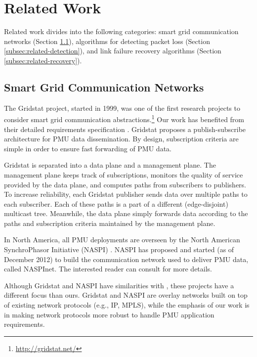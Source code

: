 
\section{Related Work}
\label{sec:related}

Related work divides into the following categories: smart grid communication networks (Section \ref{subsec:related-grid-comm}), algorithms for detecting packet loss 
(Section \ref{subsec:related-detection}), and link failure recovery algorithms (Section \ref{subsec:related-recovery}).

\subsection{Smart Grid Communication Networks}
\label{subsec:related-grid-comm}


The Gridstat project, started in 1999, was one of the first research projects to consider smart grid communication abstractions.\footnote{\url{http://gridstat.net/}}
Our work has benefited from their detailed requirements specification \cite{Bakken11}.
Gridstat proposes a publish-subscribe architecture for PMU data dissemination. By design, subscription criteria are simple in order to ensure fast forwarding of PMU data.

Gridstat is separated into a data plane and a management plane. The management plane keeps track of subscriptions,
monitors the quality of service provided by the data plane, and computes paths from subscribers to publishers.  To increase reliability, each Gridstat publisher sends data over multiple paths
to each subscriber. Each of these paths is a part of a different (edge-disjoint) multicast tree.  Meanwhile, the data plane simply forwards data according to the paths and subscription 
criteria maintained by the management plane.  

In North America, all PMU deployments are overseen by the North American SynchroPhasor Initiative (NASPI) \cite{Naspi10}.  NASPI has proposed and started (as of December 2012) to build the
communication network used to deliver PMU data, called NASPInet. The interested reader can consult \cite{Naspi10} for more details.

Although Gridstat \cite{Bakken11} and NASPI \cite{Naspi10} have similarities with \mdrs, these projects have a different focus than ours.  Gridstat and NASPI are overlay networks 
built on top of existing network protocols (e.g., IP, MPLS), while the emphasis of our work is in making network protocols more robust to handle PMU application requirements. 

